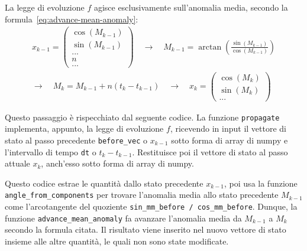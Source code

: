 \documentclass[12pt,a4paper,openright,twoside]{book}
\begin{document}
La legge di evoluzione $f$ agisce esclusivamente sull'anomalia media, secondo la formula~\ref{eq:advance-mean-anomaly}:
\begin{gather*}
x_{k-1}=\begin{pmatrix}
\cos(M_{k-1}) \\
\sin(M_{k-1}) \\
... \\
n \\
...
\end{pmatrix}
\quad\rightarrow\quad
M_{k-1}=\arctan\left(\frac{\sin(M_{k-1})}{\cos(M_{k-1})}\right) \\
\rightarrow\quad
M_k=M_{k-1}+n(t_k-t_{k-1})
\quad\rightarrow\quad
x_k=\begin{pmatrix}
\cos(M_k) \\
\sin(M_k) \\
...
\end{pmatrix}
\end{gather*}

Questo passaggio è rispecchiato dal seguente codice. La funzione \lstinline{propagate} implementa, appunto, la legge di evoluzione $f$, ricevendo in input il vettore di stato al passo precedente \lstinline{before_vec} o $x_{k-1}$ sotto forma di array di numpy e l'intervallo di tempo \lstinline{dt} o $t_k-t_{k-1}$. Restituisce poi il vettore di stato al passo attuale $x_k$, anch'esso sotto forma di array di numpy.

Questo codice estrae le quantità dallo stato precedente $x_{k-1}$, poi usa la funzione \lstinline{angle_from_components} per trovare l'anomalia media allo stato precedente $M_{k-1}$ come l'arcotangente del quoziente \lstinline{sin_mm_before / cos_mm_before}. Dunque, la funzione \lstinline{advance_mean_anomaly} fa avanzare l'anomalia media da $M_{k-1}$ a $M_k$ secondo la formula citata. Il risultato viene inserito nel nuovo vettore di stato insieme alle altre quantità, le quali non sono state modificate. \\
\end{document}
